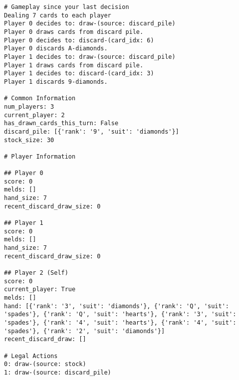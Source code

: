 \begin{tcolorbox}[
breakable,
title=Game Observation Example: Boat House Rum,  
colframe=gray, 
colback=white,
]
\begin{lstlisting}[]
# Gameplay since your last decision
Dealing 7 cards to each player
Player 0 decides to: draw-(source: discard_pile)
Player 0 draws cards from discard pile.
Player 0 decides to: discard-(card_idx: 6)
Player 0 discards A-diamonds.
Player 1 decides to: draw-(source: discard_pile)
Player 1 draws cards from discard pile.
Player 1 decides to: discard-(card_idx: 3)
Player 1 discards 9-diamonds.

# Common Information
num_players: 3
current_player: 2
has_drawn_cards_this_turn: False
discard_pile: [{'rank': '9', 'suit': 'diamonds'}]
stock_size: 30

# Player Information

## Player 0
score: 0
melds: []
hand_size: 7
recent_discard_draw_size: 0

## Player 1
score: 0
melds: []
hand_size: 7
recent_discard_draw_size: 0

## Player 2 (Self)
score: 0
current_player: True
melds: []
hand: [{'rank': '3', 'suit': 'diamonds'}, {'rank': 'Q', 'suit': 'spades'}, {'rank': 'Q', 'suit': 'hearts'}, {'rank': '3', 'suit': 'spades'}, {'rank': '4', 'suit': 'hearts'}, {'rank': '4', 'suit': 'spades'}, {'rank': '2', 'suit': 'diamonds'}]
recent_discard_draw: []

# Legal Actions
0: draw-(source: stock)
1: draw-(source: discard_pile)
\end{lstlisting}
\end{tcolorbox}